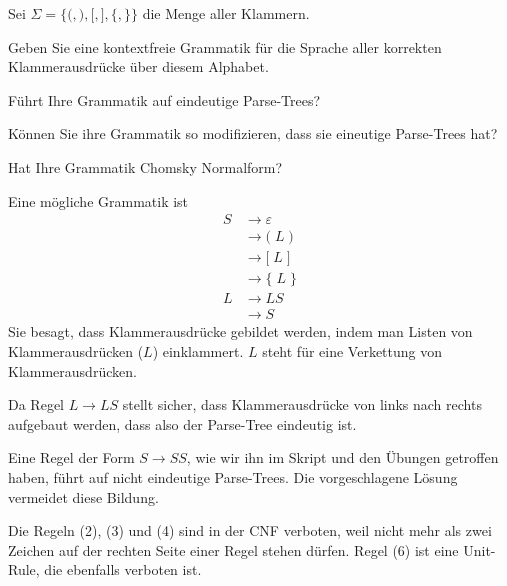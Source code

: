 Sei $\Sigma=\{
\texttt{(},
\texttt{)},
\texttt{[},
\texttt{]},
\texttt{\{},
\texttt{\}}
\}$
die Menge aller Klammern.
\begin{teilaufgaben}
\item
Geben Sie eine kontextfreie Grammatik für die Sprache aller korrekten
Klammerausdrücke über diesem Alphabet.
\item
Führt Ihre Grammatik auf eindeutige Parse-Trees?
\item
Können Sie ihre Grammatik so modifizieren, dass sie eineutige Parse-Trees hat?
\item
Hat Ihre Grammatik Chomsky Normalform?
\end{teilaufgaben}

\begin{loesung}
\begin{teilaufgaben}
\item
Eine mögliche Grammatik ist
\begin{align}
S&\rightarrow \varepsilon 
\\
 &\rightarrow \texttt{(} \; L \; \texttt{)}
\\
 &\rightarrow \texttt{[} \; L \; \texttt{]}
\\
 &\rightarrow \texttt{\{} \; L \; \texttt{\}}
\\
L&\rightarrow LS
\\
 &\rightarrow S
\end{align}
Sie besagt, dass Klammerausdrücke gebildet werden, indem man Listen
von Klammerausdrücken ($L$) einklammert.
$L$ steht für eine Verkettung von Klammerausdrücken.
\item
Da Regel $L\rightarrow LS$ stellt sicher, dass Klammerausdrücke von links
nach rechts aufgebaut werden, dass also der Parse-Tree eindeutig ist.
\item
Eine Regel der Form $S\rightarrow SS$, wie wir ihn im Skript und den
Übungen getroffen haben, führt auf nicht eindeutige Parse-Trees.
Die vorgeschlagene Lösung vermeidet diese Bildung.
\item
Die Regeln 
(2), (3) und (4) sind in der CNF verboten, weil nicht mehr als zwei
Zeichen auf der rechten Seite einer Regel stehen dürfen.
Regel (6) ist eine Unit-Rule, die ebenfalls verboten ist.
\qedhere
\end{teilaufgaben}
\end{loesung}




